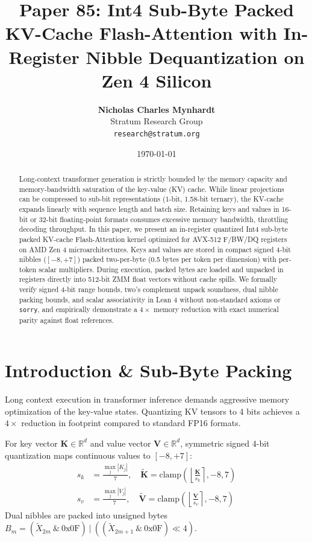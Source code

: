 \documentclass[11pt,a4paper]{article}
\title{\textbf{Paper 85: Int4 Sub-Byte Packed KV-Cache Flash-Attention with In-Register Nibble Dequantization on Zen 4 Silicon}}
\author{\textbf{Nicholas Charles Mynhardt} \\ Stratum Research Group \\ \texttt{research@stratum.org}}
\date{\today}
\begin{document}
\maketitle

\begin{abstract}
Long-context transformer generation is strictly bounded by the memory capacity and memory-bandwidth saturation of the key-value (KV) cache. While linear projections can be compressed to sub-bit representations (1-bit, 1.58-bit ternary), the KV-cache expands linearly with sequence length and batch size. Retaining keys and values in 16-bit or 32-bit floating-point formats consumes excessive memory bandwidth, throttling decoding throughput. In this paper, we present an in-register quantized Int4 sub-byte packed KV-cache Flash-Attention kernel optimized for AVX-512 F/BW/DQ registers on AMD Zen 4 microarchitectures. Keys and values are stored in compact signed 4-bit nibbles ($[-8, +7]$) packed two-per-byte (0.5 bytes per token per dimension) with per-token scalar multipliers. During execution, packed bytes are loaded and unpacked in registers directly into 512-bit ZMM float vectors without cache spills. We formally verify signed 4-bit range bounds, two's complement unpack soundness, dual nibble packing bounds, and scalar associativity in Lean 4 without non-standard axioms or \texttt{sorry}, and empirically demonstrate a $4\times$ memory reduction with exact numerical parity against float references.
\end{abstract}

\section{Introduction \& Sub-Byte Packing}
Long context execution in transformer inference demands aggressive memory optimization of the key-value states. Quantizing KV tensors to 4 bits achieves a $4\times$ reduction in footprint compared to standard FP16 formats.

For key vector $\mathbf{K} \in \mathbb{R}^d$ and value vector $\mathbf{V} \in \mathbb{R}^d$, symmetric signed 4-bit quantization maps continuous values to $[-8, +7]$:
\begin{align}
s_k &= \frac{\max_j |K_j|}{7}, \quad \tilde{\mathbf{K}} = \text{clamp}\left(\left\lfloor \frac{\mathbf{K}}{s_k} \right\rceil, -8, 7\right) \\
s_v &= \frac{\max_j |V_j|}{7}, \quad \tilde{\mathbf{V}} = \text{clamp}\left(\left\lfloor \frac{\mathbf{V}}{s_v} \right\rceil, -8, 7\right)
\end{align}
Dual nibbles are packed into unsigned bytes $B_m = (\tilde{X}_{2m} \ \& \ \text{0x0F}) \ | \ ((\tilde{X}_{2m+1} \ \& \ \text{0x0F}) \ll 4)$.
\end{document}
